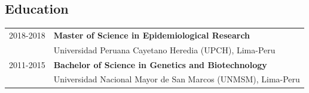 \documentclass[margin,line]{res}
\begin{document}
\begin{resume}

\section{\sc Education}

\begin{tabular}{ l l }
	2018-2018 & {\bf Master of Science in Epidemiological Research}\\ %
	& Universidad Peruana Cayetano Heredia (UPCH), Lima-Peru\\
	2011-2015 & {\bf Bachelor of Science in Genetics and Biotechnology}\\
	& Universidad Nacional Mayor de San Marcos (UNMSM), Lima-Peru\\
\end{tabular}



\end{resume}
\end{document}
